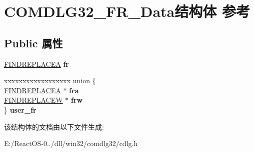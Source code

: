 \hypertarget{struct_c_o_m_d_l_g32___f_r___data}{}\section{C\+O\+M\+D\+L\+G32\+\_\+\+F\+R\+\_\+\+Data结构体 参考}
\label{struct_c_o_m_d_l_g32___f_r___data}
\subsection*{Public 属性}
\begin{DoxyCompactItemize}
\item 
\mbox{\label{struct_c_o_m_d_l_g32___f_r___data_a42e7ca48bbecbab01376b524f1fd4868}} 
\hyperlink{struct_f_i_n_d_r_e_p_l_a_c_e_a}{F\+I\+N\+D\+R\+E\+P\+L\+A\+C\+EA} {\bfseries fr}
\item 
\mbox{\label{struct_c_o_m_d_l_g32___f_r___data_adb871b730abe468bd7a4698b1c94e1b6}} 
\begin{tabbing}
xx\=xx\=xx\=xx\=xx\=xx\=xx\=xx\=xx\=\kill
union \{\\
\>\hyperlink{struct_f_i_n_d_r_e_p_l_a_c_e_a}{FINDREPLACEA} $\ast$ {\bfseries fra}\\
\>\hyperlink{struct_f_i_n_d_r_e_p_l_a_c_e_w}{FINDREPLACEW} $\ast$ {\bfseries frw}\\
\} {\bfseries user\_fr}\\

\end{tabbing}\end{DoxyCompactItemize}


该结构体的文档由以下文件生成\+:\begin{DoxyCompactItemize}
\item 
E\+:/\+React\+O\+S-\/0../dll/win32/comdlg32/cdlg.\+h\end{DoxyCompactItemize}
